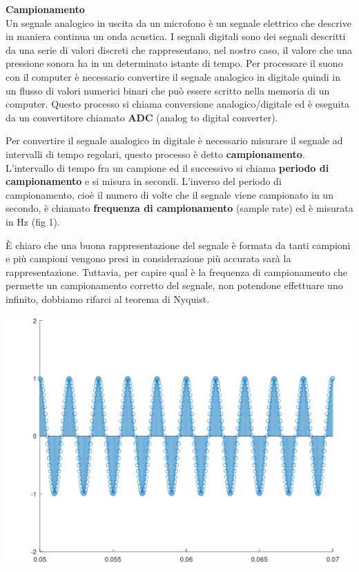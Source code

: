 \documentclass[11pt]{article}
\begin{document}
\begin{multicols*}{2}
\parskip=0pt

\textbf{\textsf {Campionamento}}\\

\noindent Un segnale analogico in uscita da un microfono è un segnale elettrico che descrive in maniera continua un onda acustica.  I segnali digitali sono dei segnali descritti da una serie di valori discreti che rappresentano, nel nostro caso, il valore che una pressione sonora ha in un determinato istante di tempo. Per processare il suono con il computer è necessario convertire il segnale analogico in digitale quindi in un flusso di valori numerici binari che può essere scritto nella memoria di un computer. Questo processo si chiama conversione analogico/digitale ed è eseguita da un convertitore chiamato \textbf{ADC}  (analog to digital converter).

Per convertire il segnale analogico in digitale è necessario misurare il segnale ad intervalli di tempo regolari, questo processo è detto \textbf{campionamento}.
L'intervallo di tempo fra un campione ed il successivo si chiama \textbf{periodo di campionamento} e si misura in secondi. L'inverso del periodo di campionamento, cioè il numero di volte che il segnale viene campionato in un secondo, è chiamato \textbf{frequenza di campionamento} (sample rate) ed è misurata in Hz (fig 1).

È chiaro che una buona rappresentazione del segnale è formata da tanti campioni e più campioni vengono presi in considerazione più accurata sarà la rappresentazione. Tuttavia, per capire qual è la frequenza di 
campionamento che permette un campionamento corretto del segnale, non potendone effettuare uno infinito, dobbiamo rifarci al teorema di Nyquist.

\begin{center}
\includegraphics[scale=0.2]{images/plot02.png}


\end{center}
\end{multicols*}
\end{document}
